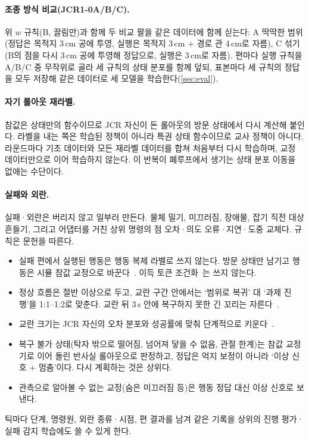 \paragraph{조종 방식 비교(JCR1-0A/B/C).} 위 $w$ 규칙(B, 끌림만)과 함께 두 비교 팔을 같은 데이터에 함께 싣는다: A 딱딱한 범위(정답은 목적지 3\,cm 공에 투영, 실행은 목적지 3\,cm + 경로 관 4\,cm로 자름), C 섞기(B의 점을 다시 3\,cm 공에 투영해 정답으로, 실행은 3\,cm로 자름). 편마다 실행 규칙을 A/B/C 중 무작위로 골라 세 규칙의 상태 분포를 함께 덮되, 표본마다 세 규칙의 정답을 모두 저장해 같은 데이터로 세 모델을 학습한다(\cref{sec:eval}).

\paragraph{자기 롤아웃 재라벨.} 참값은 상태만의 함수이므로 JCR 자신이 돈 롤아웃의 방문 상태에서 다시 계산해 붙인다. 라벨을 내는 쪽은 학습된 정책이 아니라 특권 상태 함수이므로 교사 정책이 아니다. 라운드마다 기초 데이터와 모든 재라벨 데이터를 합쳐 처음부터 다시 학습하며, 교정 데이터만으로 이어 학습하지 않는다. 이 반복이 폐루프에서 생기는 상태 분포 이동을 없애는 수단이다.

\paragraph{실패와 외란.} 실패·외란은 버리지 않고 일부러 만든다. 물체 밀기, 미끄러짐, 장애물, 잡기 직전 대상 흔들기, 그리고 어댑터를 거친 상위 명령의 점 오차·의도 오류·지연·도중 교체다. 규칙은 문헌을 따른다.
\begin{itemize}
  \item 실패 편에서 실행된 행동은 행동 복제 라벨로 쓰지 않는다. 방문 상태만 남기고 행동은 시뮬 참값 교정으로 바꾼다~\cite{crdagger2025,rac2025}. 이득 토큰 조건화~\cite{recap2025}는 쓰지 않는다.
  \item 정상 흐름은 절반 이상으로 두고, 교란 구간 안에서는 `범위로 복귀' 대 `과제 진행'을 1:1--1:2로 맞춘다. 교란 뒤 3\,s 안에 복구하지 못한 긴 꼬리는 자른다~\cite{rac2025}.
  \item 교란 크기는 JCR 자신의 오차 분포와 성공률에 맞춰 단계적으로 키운다~\cite{laskey2017dart}.
  \item 복구 불가 상태(탁자 밖으로 떨어짐, 넘어져 닿을 수 없음, 관절 한계)는 참값 교정기로 이어 돌린 반사실 롤아웃으로 판정하고, 정답은 억지 보정이 아니라 `이상 신호 + 멈춤'이다. 다시 계획하는 것은 상위다.
  \item 관측으로 알아볼 수 없는 교정(숨은 미끄러짐 등)은 행동 정답 대신 이상 신호로 보낸다.
\end{itemize}
틱마다 단계, 명령원, 외란 종류·시점, 편 결과를 남겨 같은 기록을 상위의 진행 평가·실패 감지 학습에도 쓸 수 있게 한다.


